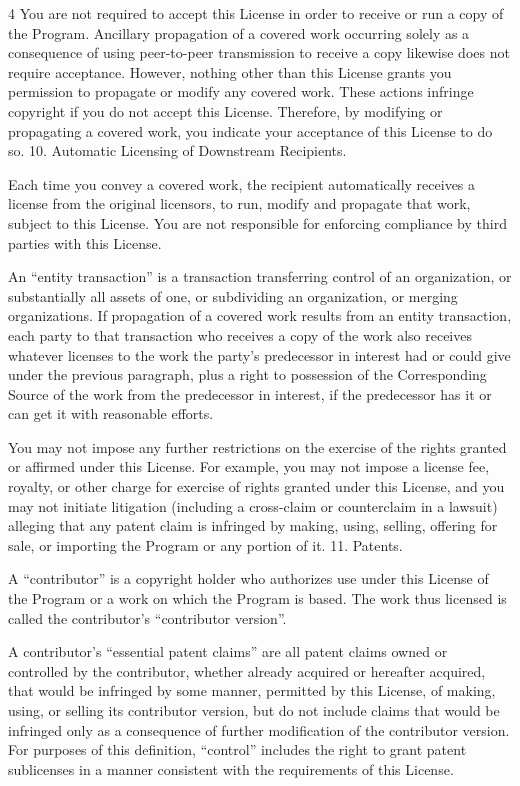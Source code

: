 \documentclass[fontsize=11pt,paper=A4,BCOR=12mm,DIV=13,open=any,listof=totoc,toc=flat]{scrbook}
\begin{document}
{\begin{multicols}{4}
You are not required to accept this License in order to receive or run a copy of the Program. Ancillary propagation of a covered work occurring solely as a consequence of using peer-to-peer transmission to receive a copy likewise does not require acceptance. However, nothing other than this License grants you permission to propagate or modify any covered work. These actions infringe copyright if you do not accept this License. Therefore, by modifying or propagating a covered work, you indicate your acceptance of this License to do so.
10. Automatic Licensing of Downstream Recipients.

Each time you convey a covered work, the recipient automatically receives a license from the original licensors, to run, modify and propagate that work, subject to this License. You are not responsible for enforcing compliance by third parties with this License.

An “entity transaction” is a transaction transferring control of an organization, or substantially all assets of one, or subdividing an organization, or merging organizations. If propagation of a covered work results from an entity transaction, each party to that transaction who receives a copy of the work also receives whatever licenses to the work the party's predecessor in interest had or could give under the previous paragraph, plus a right to possession of the Corresponding Source of the work from the predecessor in interest, if the predecessor has it or can get it with reasonable efforts.

You may not impose any further restrictions on the exercise of the rights granted or affirmed under this License. For example, you may not impose a license fee, royalty, or other charge for exercise of rights granted under this License, and you may not initiate litigation (including a cross-claim or counterclaim in a lawsuit) alleging that any patent claim is infringed by making, using, selling, offering for sale, or importing the Program or any portion of it.
11. Patents.

A “contributor” is a copyright holder who authorizes use under this License of the Program or a work on which the Program is based. The work thus licensed is called the contributor's “contributor version”.

A contributor's “essential patent claims” are all patent claims owned or controlled by the contributor, whether already acquired or hereafter acquired, that would be infringed by some manner, permitted by this License, of making, using, or selling its contributor version, but do not include claims that would be infringed only as a consequence of further modification of the contributor version. For purposes of this definition, “control” includes the right to grant patent sublicenses in a manner consistent with the requirements of this License.


\end{multicols}}
\end{document}
